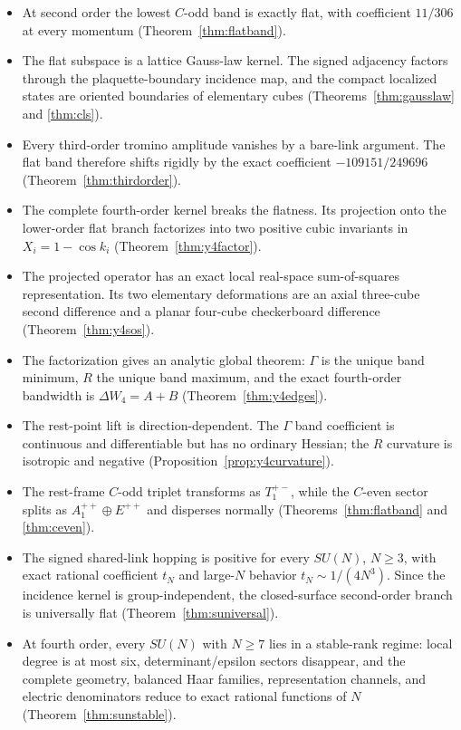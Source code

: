 \documentclass[11pt]{article}
\begin{document}
\begin{itemize}
\item[(A)] At second order the lowest $C$-odd band is exactly flat, with
coefficient $11/306$ at every momentum (Theorem~\ref{thm:flatband}).
\item[(B)] The flat subspace is a lattice Gauss-law kernel. The signed
adjacency factors through the plaquette-boundary incidence map, and the
compact localized states are oriented boundaries of elementary cubes
(Theorems~\ref{thm:gausslaw} and \ref{thm:cls}).
\item[(C)] Every third-order tromino amplitude vanishes by a bare-link
argument. The flat band therefore shifts rigidly by the exact coefficient
$-109151/249696$ (Theorem~\ref{thm:thirdorder}).
\item[(D)] The complete fourth-order kernel breaks the flatness. Its
projection onto the lower-order flat branch factorizes into two positive
cubic invariants in $X_i=1-\cos k_i$ (Theorem~\ref{thm:y4factor}).
\item[(E)] The projected operator has an exact local real-space
sum-of-squares representation. Its two elementary deformations are an axial
three-cube second difference and a planar four-cube checkerboard difference
(Theorem~\ref{thm:y4sos}).
\item[(F)] The factorization gives an analytic global theorem: $\Gamma$ is
the unique band minimum, $R$ the unique band maximum, and the exact
fourth-order bandwidth is $\Delta W_4=A+B$
(Theorem~\ref{thm:y4edges}).
\item[(G)] The rest-point lift is direction-dependent. The $\Gamma$ band
coefficient is continuous and differentiable but has no ordinary Hessian;
the $R$ curvature is isotropic and negative
(Proposition~\ref{prop:y4curvature}).
\item[(H)] The rest-frame $C$-odd triplet transforms as $T_1^{+-}$, while
the $C$-even sector splits as $A_1^{++}\oplus E^{++}$ and disperses normally
(Theorems~\ref{thm:flatband} and \ref{thm:ceven}).
\item[(I)] The signed shared-link hopping is positive for every $SU(N)$,
$N\geq3$, with exact rational coefficient $t_N$ and large-$N$ behavior
$t_N\sim1/(4N^3)$. Since the incidence kernel is group-independent, the
closed-surface second-order branch is universally flat
(Theorem~\ref{thm:suniversal}).
\item[(J)] At fourth order, every $SU(N)$ with $N\geq7$ lies in a stable-rank
regime: local degree is at most six, determinant/epsilon sectors disappear,
and the complete geometry, balanced Haar families, representation channels,
and electric denominators reduce to exact rational functions of $N$
(Theorem~\ref{thm:sunstable}).
\end{itemize}
\end{document}
